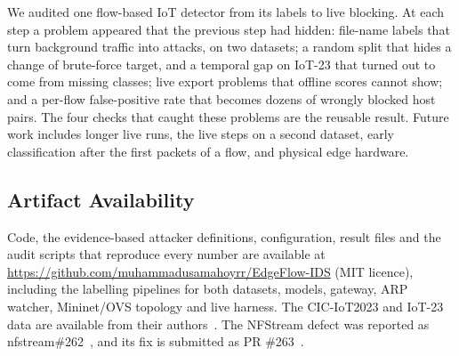 We audited one flow-based IoT detector from its labels to live blocking. At each step a problem appeared that the previous step had hidden: file-name labels that turn background traffic into attacks, on two datasets; a random split that hides a change of brute-force target, and a temporal gap on IoT-23 that turned out to come from missing classes; live export problems that offline scores cannot show; and a per-flow false-positive rate that becomes dozens of wrongly blocked host pairs. The four checks that caught these problems are the reusable result. Future work includes longer live runs, the live steps on a second dataset, early classification after the first packets of a flow, and physical edge hardware.

\subsection{Artifact Availability}

Code, the evidence-based attacker definitions, configuration, result files and the audit scripts that reproduce every number are available at \url{https://github.com/muhammadusamahoyrr/EdgeFlow-IDS} (MIT licence), including the labelling pipelines for both datasets, models, gateway, ARP watcher, Mininet/OVS topology and live harness. The CIC-IoT2023 and IoT-23 data are available from their authors~\cite{neto2023ciciot2023,garcia2020iot23}. The NFStream defect was reported as nfstream\#262~\cite{nfstream262}, and its fix is submitted as PR \#263~\cite{nfstream263}.
